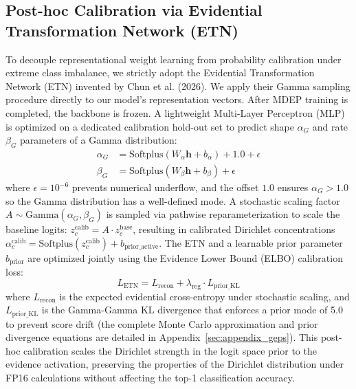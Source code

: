 \documentclass[letterpaper]{article} %
\begin{document}
\subsection{Post-hoc Calibration via Evidential Transformation Network (ETN)}
To decouple representational weight learning from probability calibration under extreme class imbalance, we strictly adopt the Evidential Transformation Network (ETN) invented by Chun et al. (2026). We apply their Gamma sampling procedure directly to our model's representation vectors. After MDEP training is completed, the backbone is frozen. A lightweight Multi-Layer Perceptron (MLP) is optimized on a dedicated calibration hold-out set to predict shape $\alpha_G$ and rate $\beta_G$ parameters of a Gamma distribution:
\begin{align}
    \alpha_G &= \text{Softplus}(W_{\alpha} \bm{h} + b_{\alpha}) + 1.0 + \epsilon \\
    \beta_G &= \text{Softplus}(W_{\beta} \bm{h} + b_{\beta}) + \epsilon
\end{align}
where $\epsilon = 10^{-6}$ prevents numerical underflow, and the offset $1.0$ ensures $\alpha_G > 1.0$ so the Gamma distribution has a well-defined mode. A stochastic scaling factor $A \sim \text{Gamma}(\alpha_G, \beta_G)$ is sampled via pathwise reparameterization to scale the baseline logits: $z^{\text{calib}}_c = A \cdot z^{\text{base}}_c$, resulting in calibrated Dirichlet concentrations $\alpha^{\text{calib}}_c = \text{Softplus}(z^{\text{calib}}_c) + b_{\text{prior\_active}}$.
The ETN and a learnable prior parameter $b_{\text{prior}}$ are optimized jointly using the Evidence Lower Bound (ELBO) calibration loss:
\begin{equation}\label{eq:etn_loss_main}
    L_{\text{ETN}} = L_{\text{recon}} + \lambda_{\text{reg}} \cdot L_{\text{prior\_KL}}
\end{equation}
where $L_{\text{recon}}$ is the expected evidential cross-entropy under stochastic scaling, and $L_{\text{prior\_KL}}$ is the Gamma-Gamma KL divergence that enforces a prior mode of 5.0 to prevent score drift (the complete Monte Carlo approximation and prior divergence equations are detailed in Appendix~\ref{sec:appendix_geps}). This post-hoc calibration scales the Dirichlet strength in the logit space prior to the evidence activation, preserving the properties of the Dirichlet distribution under FP16 calculations without affecting the top-1 classification accuracy.

\end{document}
